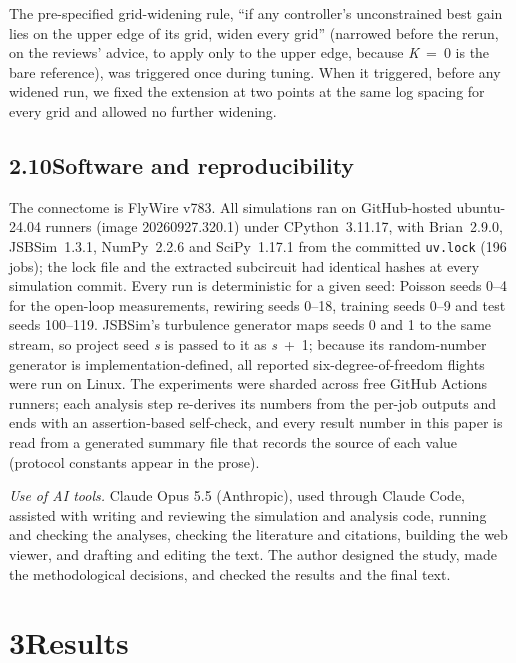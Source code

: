 \documentclass[11pt,letterpaper]{article}
\begin{document}
The pre-specified grid-widening rule, ``if any controller's
unconstrained best gain lies on the upper edge of its grid, widen every
grid'' (narrowed before the rerun, on the reviews' advice, to apply only
to the upper edge, because \emph{K}~=~0 is the bare reference), was
triggered once during tuning. When it triggered, before any widened run,
we fixed the extension at two points at the same log spacing for every
grid and allowed no further widening.

\subsection{\texorpdfstring{2.10\quad Software and
reproducibility}{2.10Software and reproducibility}}\label{software-and-reproducibility}

\noindent The connectome is FlyWire v783. All simulations ran on
GitHub-hosted ubuntu-24.04 runners (image 20260927.320.1) under
CPython~3.11.17, with Brian~2.9.0, JSBSim~1.3.1, NumPy~2.2.6 and
SciPy~1.17.1 from the committed \texttt{uv.lock} (196 jobs); the lock
file and the extracted subcircuit had identical hashes at every
simulation commit. Every run is deterministic for a given seed: Poisson
seeds 0--4 for the open-loop measurements, rewiring seeds 0--18,
training seeds 0--9 and test seeds 100--119. JSBSim's turbulence
generator maps seeds 0 and 1 to the same stream, so project seed
\emph{s} is passed to it as \emph{s}~+~1; because its random-number
generator is implementation-defined, all reported six-degree-of-freedom
flights were run on Linux. The experiments were sharded across free
GitHub Actions runners; each analysis step re-derives its numbers from
the per-job outputs and ends with an assertion-based self-check, and
every result number in this paper is read from a generated summary file
that records the source of each value (protocol constants appear in the
prose).

\emph{Use of AI tools.} Claude Opus 5.5 (Anthropic), used through Claude
Code, assisted with writing and reviewing the simulation and analysis
code, running and checking the analyses, checking the literature and
citations, building the web viewer, and drafting and editing the text.
The author designed the study, made the methodological decisions, and
checked the results and the final text.

\protect{}\label{s3}
\section{\texorpdfstring{3\quad Results}{3Results}}\label{results}
\end{document}
